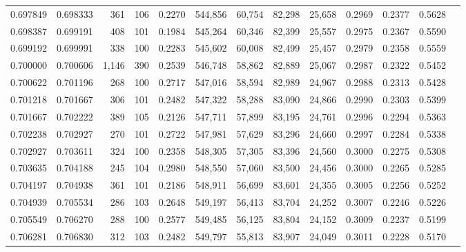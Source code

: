 \begin{tabular}{rrrrrrrrrrrrr}
0.697849 & 0.698333 &    361 &   106 &                                     0.2270 & 544,856 &  60,754 &  82,298 &  25,658 & 0.2969 & 0.2377 & 0.5628 \\
0.698387 & 0.699191 &    408 &   101 &                                     0.1984 & 545,264 &  60,346 &  82,399 &  25,557 & 0.2975 & 0.2367 & 0.5590 \\
0.699192 & 0.699991 &    338 &   100 &                                     0.2283 & 545,602 &  60,008 &  82,499 &  25,457 & 0.2979 & 0.2358 & 0.5559 \\
0.700000 & 0.700606 &  1,146 &   390 &                                     0.2539 & 546,748 &  58,862 &  82,889 &  25,067 & 0.2987 & 0.2322 & 0.5452 \\
0.700622 & 0.701196 &    268 &   100 &                                     0.2717 & 547,016 &  58,594 &  82,989 &  24,967 & 0.2988 & 0.2313 & 0.5428 \\
0.701218 & 0.701667 &    306 &   101 &                                     0.2482 & 547,322 &  58,288 &  83,090 &  24,866 & 0.2990 & 0.2303 & 0.5399 \\
0.701667 & 0.702222 &    389 &   105 &                                     0.2126 & 547,711 &  57,899 &  83,195 &  24,761 & 0.2996 & 0.2294 & 0.5363 \\
0.702238 & 0.702927 &    270 &   101 &                                     0.2722 & 547,981 &  57,629 &  83,296 &  24,660 & 0.2997 & 0.2284 & 0.5338 \\
0.702927 & 0.703611 &    324 &   100 &                                     0.2358 & 548,305 &  57,305 &  83,396 &  24,560 & 0.3000 & 0.2275 & 0.5308 \\
0.703635 & 0.704188 &    245 &   104 &                                     0.2980 & 548,550 &  57,060 &  83,500 &  24,456 & 0.3000 & 0.2265 & 0.5285 \\
0.704197 & 0.704938 &    361 &   101 &                                     0.2186 & 548,911 &  56,699 &  83,601 &  24,355 & 0.3005 & 0.2256 & 0.5252 \\
0.704939 & 0.705534 &    286 &   103 &                                     0.2648 & 549,197 &  56,413 &  83,704 &  24,252 & 0.3007 & 0.2246 & 0.5226 \\
0.705549 & 0.706270 &    288 &   100 &                                     0.2577 & 549,485 &  56,125 &  83,804 &  24,152 & 0.3009 & 0.2237 & 0.5199 \\
0.706281 & 0.706830 &    312 &   103 &                                     0.2482 & 549,797 &  55,813 &  83,907 &  24,049 & 0.3011 & 0.2228 & 0.5170 \\

\end{tabular}
